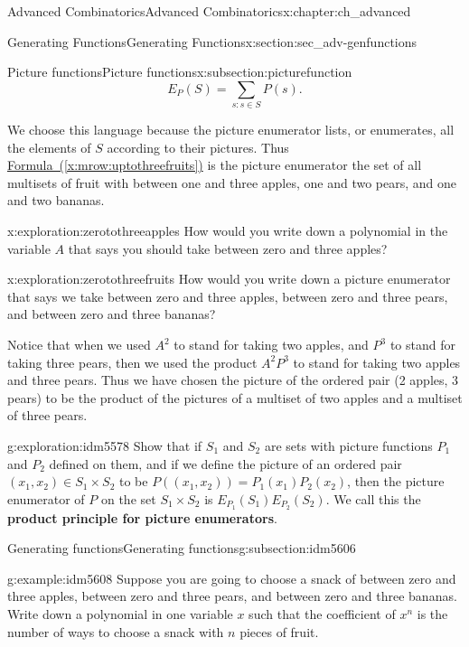 \documentclass[oneside,10pt,]{book}
\newcommand{\terminology}[1]{\textbf{#1}}
\numberwithin{equation}{chapter}
\begin{document}
\begin{chapterptx}{Advanced Combinatorics}{}{Advanced Combinatorics}{}{}{x:chapter:ch_advanced}
\begin{sectionptx}{Generating Functions}{}{Generating Functions}{}{}{x:section:sec_adv-genfunctions}
\begin{subsectionptx}{Picture functions}{}{Picture functions}{}{}{x:subsection:picturefunction}
\begin{equation*}
E_P(S) = \sum_{s: s\in S}  P(s).
\end{equation*}
%
\par
We choose this language because the picture enumerator lists, or enumerates, all the elements of \(S\) according to their pictures. Thus \hyperref[x:mrow:uptothreefruits]{Formula~(\ref{x:mrow:uptothreefruits})} is the picture enumerator the set of all multisets of fruit with between one and three apples, one and two pears, and one and two bananas.%
\begin{exploration}{}{x:exploration:zerotothreeapples}%
How would you write down a polynomial in the variable \(A\) that says you should take between zero and three apples?%
\end{exploration}
\begin{exploration}{}{x:exploration:zerotothreefruits}%
How would you write down a picture enumerator that says we take between zero and three apples, between zero and three pears, and between zero and three bananas?%
\end{exploration}
Notice that when we used \(A^2\) to stand for taking two apples, and \(P^3\) to stand for taking three pears, then we used the product \(A^2P^3\) to stand for taking two apples and three pears. Thus we have chosen the picture of the ordered pair (2 apples, 3 pears) to be the product of the pictures of a multiset of two apples and a multiset of three pears.%
\begin{exploration}{}{g:exploration:idm5578}%
Show that if \(S_1\) and \(S_2\) are sets with picture functions \(P_1\) and \(P_2\) defined on them, and if we define the picture of an ordered pair \((x_1,x_2)\in S_1\times S_2\) to be \(P((x_1,x_2))= P_1(x_1)P_2(x_2)\), then the picture enumerator of \(P\) on the set \(S_1\times S_2\) is \(E_{P_1}(S_1)E_{P_2}(S_2)\). We call this the \terminology{product principle for picture enumerators}.%
\end{exploration}
\end{subsectionptx}
%
%
\typeout{************************************************}
\typeout{************************************************}
%
\begin{subsectionptx}{Generating functions}{}{Generating functions}{}{}{g:subsection:idm5606}
\begin{example}{}{g:example:idm5608}%
Suppose you are going to choose a snack of between zero and three apples, between zero and three pears, and between zero and three bananas. Write down a polynomial in one variable \(x\) such that the coefficient of \(x^n\) is the number of ways to choose a snack with \(n\) pieces of fruit.%

\end{example}
\end{subsectionptx}
\end{sectionptx}
\end{chapterptx}
\end{document}
